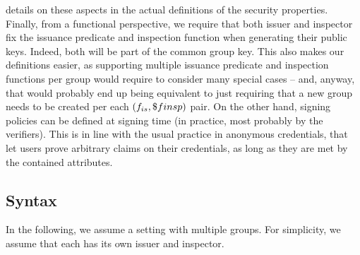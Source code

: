 details on these aspects in the actual definitions of the security properties.
%
Finally, from a functional perspective, we require that both issuer and
inspector fix the issuance predicate \fiss and inspection function \finsp when
generating their public keys. Indeed, both will be part of the common group key.
This also makes our definitions easier, as supporting multiple issuance
predicate and inspection functions per group would require to consider many
special cases -- and, anyway, that would probably end up being equivalent to
just requiring that a new group needs to be created per each $(f_{is},\$finsp)$
pair. On the other hand, signing policies can be defined at signing time (in
practice, most probably by the verifiers). This is in line with the usual
practice in anonymous credentials, that let users prove arbitrary claims on
their credentials, as long as they are met by the contained attributes.

\subsection{Syntax}
\label{ssec:syntax}

In the following, we assume a setting with multiple groups. For simplicity,
we assume that each has its own issuer and inspector.



